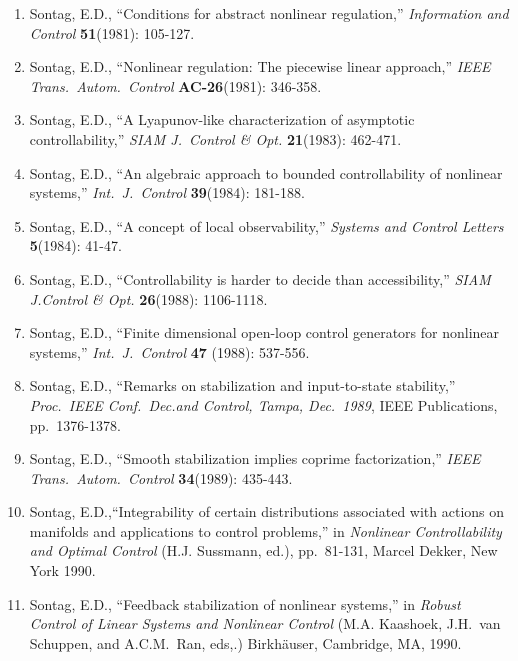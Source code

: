 \begin{enumerate}
\item
Sontag, E.D., ``Conditions for abstract nonlinear regulation,'' {\it
Information and Control} {\bf 51}(1981): 105-127.

\item
Sontag, E.D., ``Nonlinear regulation: The piecewise linear approach,'' {\it
IEEE Trans.\ Autom.\ Control} {\bf AC-26}(1981): 346-358.

\item
Sontag, E.D., ``A Lyapunov-like characterization of asymptotic
controllability,'' {\it SIAM J.\ Control \& Opt.} {\bf 21}(1983): 462-471.

\item
Sontag, E.D., ``An algebraic approach to bounded controllability of nonlinear
systems,'' {\it Int.\ J.\ Control} {\bf 39}(1984): 181-188.

\item
Sontag, E.D., ``A concept of local observability,'' {\it Systems and Control
Letters} {\bf 5}(1984): 41-47.

\item
Sontag, E.D., ``Controllability is harder to decide than accessibility,'' {\it
SIAM J.Control \& Opt.} {\bf 26}(1988): 1106-1118.

\item
Sontag, E.D., ``Finite dimensional open-loop control generators for nonlinear
systems,'' {\it Int.\ J.\ Control} {\bf 47} (1988): 537-556.

\item
Sontag, E.D., ``Remarks on stabilization and input-to-state stability,'' {\it
Proc.\ IEEE Conf.\ Dec.and Control, Tampa, Dec.\ 1989}, IEEE Publications,
pp.\ 1376-1378.

\item
Sontag, E.D., ``Smooth stabilization implies coprime factorization,'' {\it
IEEE Trans.\ Autom.\ Control} {\bf 34}(1989): 435-443.

\item
Sontag, E.D.,``Integrability of certain distributions associated with actions
on manifolds and applications to control problems,'' in {\it Nonlinear
Controllability and Optimal Control} (H.J. Sussmann, ed.), pp.\ 81-131, Marcel
Dekker, New York 1990.

\item
Sontag, E.D., ``Feedback stabilization of nonlinear systems,'' in {\it Robust
Control of Linear Systems and Nonlinear Control} (M.A. Kaashoek, J.H.\ van
Schuppen, and A.C.M.\ Ran, eds,.)  Birkh\"auser, Cambridge, MA, 1990.


\end{enumerate}
